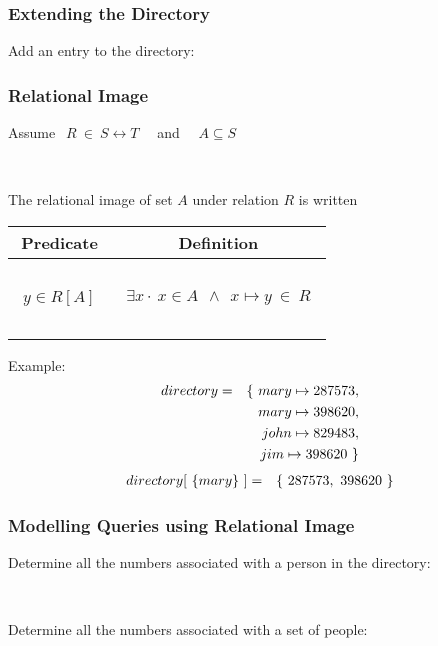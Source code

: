 \documentclass{beamer}
\begin{document}
\begin{frame}

\frametitle{Extending the Directory}

Add an entry to the directory:



\end{frame}



\begin{frame}

\frametitle{Relational Image}

Assume $~~R ~\in~ S\rel T $   ~~and~~ $A\subseteq S$

~


The \alert{relational image} of set $A$ under relation $R$ is written~

\begin{center}
\begin{tabular}{|c|c|}
\hline
Predicate & Definition \\[2pt] \hline
~&\\
$~~y   \in R[A]   ~~$ &  $~~\exists x\cdot ~ x\in A ~~\land~~ x \mapsto y~\in~ R~~$  \\
~&\\ \hline\end{tabular}
\end{center}



Example:
\begin{eqnarray*}
    directory & = &
    \{~ mary \mapsto 287573, \\
&&  ~~mary \mapsto 398620, \\
&&  ~~john \mapsto 829483, \\
&&  ~~jim \mapsto 398620 ~\}
\end{eqnarray*}
%
\begin{eqnarray*}
    directory[~\{mary\}~] & = &
    \{~  287573,~ 398620 ~\}
\end{eqnarray*}




\end{frame}



\begin{frame}

\frametitle{Modelling Queries using Relational Image}

Determine all the numbers associated with a person in the directory:

~

Determine all the numbers associated with a set of people:

\end{frame}
\end{document}
